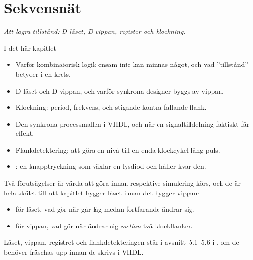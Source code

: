 
\chapter{Sekvensnät}
\label{c3:ch}

{\large\itshape Att lagra tillstånd: D-låset, D-vippan, register och klockning.\par}

\begin{chapterbox}{I det här kapitlet}
\begin{itemize}
  \item Varför kombinatorisk logik ensam inte kan minnas något, och vad ”tillstånd” betyder i en
    krets.
  \item D-låset och D-vippan, och varför synkrona designer byggs av vippan.
  \item Klockning: period, frekvens, och stigande kontra fallande flank.
  \item Den synkrona processmallen i VHDL, och när en signaltilldelning faktiskt får effekt.
  \item Flankdetektering: att göra en nivå till en enda klockcykel lång puls.
  \item {}: en knapptryckning som växlar en lysdiod och håller kvar den.
\end{itemize}
\end{chapterbox}

Två förutsägelser är värda att göra innan respektive simulering körs, och de är hela skälet till
att kapitlet bygger låset innan det bygger vippan:
\begin{itemize}
  \item för låset, vad  gör när  går låg medan  fortfarande ändrar
    sig.
  \item för vippan, vad  gör när  ändrar sig \emph{mellan} två klockflanker.
\end{itemize}

\note[Repetition] Låset, vippan, registret och flankdetekteringen står i avsnitt~5.1--5.6 i
\debook{}, om de behöver fräschas upp innan de skrivs i VHDL.




